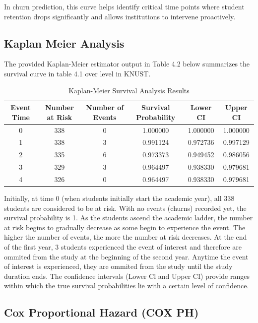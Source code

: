 \documentclass[doublespacing]{report} %
\begin{document}
In churn prediction, this curve helps identify critical time points where student retention drops significantly and allows institutions to intervene proactively. 



\subsection{Kaplan Meier Analysis}

The provided Kaplan-Meier estimator output in Table 4.2 below summarizes the survival curve in table 4.1 over level in KNUST.

\begin{table}[ht]
    \centering
    \begin{tabular}{cccccc}
        \toprule
        Event Time & Number at Risk& Number of Events & Survival Probability & Lower CI & Upper CI \\
        \midrule
        0 & 338 & 0 & 1.000000 & 1.000000 & 1.000000 \\
        1 & 338 & 3 & 0.991124 & 0.972736 & 0.997129 \\
        2 & 335 & 6 & 0.973373 & 0.949452 & 0.986056 \\
        3 & 329 & 3 & 0.964497 & 0.938330 & 0.979681 \\
        4 & 326 & 0 & 0.964497 & 0.938330 & 0.979681 \\
        \bottomrule
    \end{tabular}
    \caption{Kaplan-Meier Survival Analysis Results}
    \label{tab:km_results}
\end{table}


Initially, at time 0 (when students initially start the academic year), all 338 students are considered to be at risk. With no events (churns) recorded yet, the survival probability is 1.
As the students ascend the academic ladder, the number at risk begins to gradually decrease as some begin to experience the event. The higher the number of events, the more the number at risk decreases. 
At the end of the first year, 3 students experienced the event of interest and therefore are ommited from the study at the beginning of the second year.  Anytime the event of interest is experienced, they are ommited from the study until the study duration ends.   
The confidence intervals (Lower Cl and Upper CI) provide ranges within which the true survival probabilities lie with a certain level of confidence.


\subsection{Cox Proportional Hazard (COX PH)}
\end{document}
